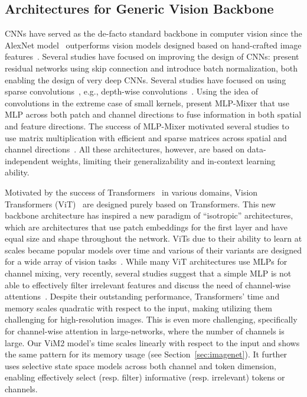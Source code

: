 \documentclass{article}
\newcommand{\head}[1]{\vspace{1.7mm}\noindent{{\textcolor{c1}{\bf #1.}}}}
\begin{document}
\subsection{Architectures for Generic Vision Backbone}
\head{Convolutional Neural Networks and Mixer Architectures} CNNs have served as the de-facto standard backbone in computer vision since the AlexNet model~\citep{krizhevsky2012imagenet} outperforms vision models designed based on hand-crafted image features~\citep{pinz2006object}. Several studies have focused on improving the design of CNNs: \citet{He2016resnet} present residual networks using skip connection and \citet{ioffe2015batch} introduce batch normalization, both enabling the design of very deep CNNs. Several studies have focused on using sparse convolutions~\citep{xie2017aggregated, liu2015sparse}, e.g., depth-wise convolutions~\citep{guo2019depthwise}. Using the idea of convolutions in the extreme case of small kernels, \citep{tolstikhin2021mlp} present MLP-Mixer that use MLP across both patch and channel directions to fuse information in both spatial and feature directions. The success of MLP-Mixer motivated several studies to use matrix multiplication with efficient and sparse matrices across spatial and channel directions~\citep{wang2022dynamixer, tang2022sparse, fu2023monarch}. All these architectures, however, are based on data-independent weights, limiting their generalizability and in-context learning ability. 

\head{Vision Transformers} Motivated by the success of Transformers~\citep{vaswani2017attention} in various domains, Vision Transformers (ViT)~\citep{dosovitskiy2021ViT} are designed purely based on Transformers. This new backbone architecture has inspired a new paradigm of “isotropic” architectures, which are architectures that use patch embeddings for the first layer and have equal size and shape throughout the network. ViTs due to their ability to learn at scales became popular models over time and various of their variants are designed for a wide array of vision tasks~\citep{liu2021swin, liu2022swin, liu2021image, touvron2021training}. While many ViT architectures use MLPs for channel mixing, very recently, several studies suggest that a simple MLP is not able to effectively filter irrelevant features and discuss the need of channel-wise attentions~\citep{zamir2022restormer, zhang2022resnest}. Despite their outstanding performance, Transformers' time and memory scales quadratic with respect to the input, making utilizing them challenging for high-resolution images. This is even more challenging, specifically for channel-wise attention in large-networks, where the number of channels is large. Our ViM2 model's time scales linearly with respect to the input and shows the same pattern for its memory usage (see Section~\ref{sec:imagenet}). It further uses selective state space models across both channel and token dimension, enabling effectively select (resp. filter) informative (resp. irrelevant) tokens or channels. 
\end{document}

